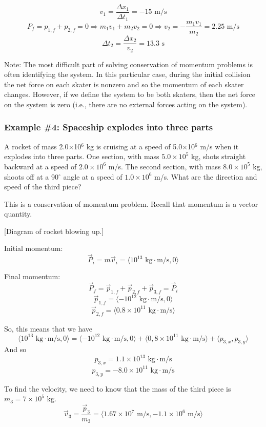 $$v_1=\frac{\Delta{x_1}}{\Delta{t_1}}=-15\mbox{ m/s}$$
$$P_f=p_{1,f}+p_{2,f}=0\Rightarrow m_1v_1+m_2v_2=0\Rightarrow v_2=-\frac{m_1v_1}{m_2}=2.25\mbox{ m/s}$$
$$\Delta{t_2}=\frac{\Delta{x_2}}{v_2}=13.3\mbox{ s}$$

Note: The most difficult part of solving conservation of momentum problems is often identifying the system. In this particular case, during the initial collision the net force on each skater is nonzero and so the momentum of each skater changes. However, if we define the system to be both skaters, then the net force on the system is zero (i.e., there are no external forces acting on the system).

\subsubsection*{Example \#4: Spaceship explodes into three parts}
A rocket of mass 2.0$\times$10$^6$ kg is cruising at a speed of 5.0$\times$10$^6$ m/s when it explodes into three parts. One section, with mass $5.0\times 10^5$ kg, shots straight backward at a speed of $2.0\times 10^6$ m/s. The second section, with mass $8.0\times 10^5$ kg, shoots off at a 90$^\circ$ angle at a speed of $1.0\times 10^6$ m/s. What are the direction and speed of the third piece?

This is a conservation of momentum problem. Recall that momentum is a vector quantity.


[Diagram of rocket blowing up.]\nopagebreak
\vspace{4cm}

Initial momentum: 
$$\vec{P}_i=m\vec{v}_i=\langle{10^{13}\mbox{ kg}\cdot\mbox{m/s}, 0}\rangle$$

Final momentum:
$$\vec{P}_f=\vec{p}_{1,f}+\vec{p}_{2,f}+\vec{p}_{3,f}=\vec{P}_i$$
$$\vec{p}_{1,f}=\langle{-10^{12}\mbox{ kg}\cdot\mbox{m/s},0}\rangle$$
$$\vec{p}_{2,f}=\langle{0.8\times 10^{11}\mbox{ kg}\cdot\mbox{m/s}}\rangle$$

So, this means that we have
$$\langle{10^{13}\mbox{ kg}\cdot\mbox{m/s},0}\rangle=\langle{-10^{12}\mbox{ kg}\cdot\mbox{m/s},0}\rangle+\langle{0,8\times 10^{11}\mbox{ kg}\cdot\mbox{m/s}}\rangle+\langle{p_{3,x},p_{3,y}}\rangle$$
And so
$$p_{3,x}=1.1\times 10^{13}\mbox{ kg}\cdot\mbox{m/s}$$
$$p_{3,y}=-8.0\times 10^{11}\mbox{ kg}\cdot\mbox{m/s}$$

To find the velocity, we need to know that the mass of the third piece is $m_3=7\times 10^5$ kg.
$$\vec{v}_3=\frac{\vec{p}_3}{m_3}=\langle{1.67\times 10^7\mbox{ m/s},-1.1\times 10^6\mbox{ m/s}}\rangle$$

\clearpage
